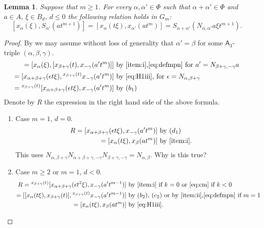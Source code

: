 \documentclass[oneside, 10pt]{amsart}
\newcommand{\rA}{\mathsf{A}}
\numberwithin{equation}{section}
\newtheorem{lemma}{Lemma}
\numberwithin{lemma}{section}
\theoremstyle{definition}
\theoremstyle{remark}
\begin{document}
\begin{lemma} \label{lem:bmp1} Suppose that $m\geq 1$. For every $\alpha, \alpha' \in \Phi$ such that $\alpha+\alpha' \in \Phi$ and
 $a\in A$, $\xi \in B_d$, $d \leq 0$ the following relation holds in $G_m$: 
\begin{equation} \nonumber
[x_\alpha(\xi), S_{\alpha'}(at^{m+1})] = [x_\alpha(t\xi), x_{\alpha'}(at^m)] = S_{\alpha+\alpha'}(N_{\alpha,\alpha'}a\xi t^{m+1}).
\end{equation}
\end{lemma}
\begin{proof}
By \cite[Lemma~3.1.2]{RS76} we may assume without loss of generality that $\alpha'=\beta$ for some $\rA_3$-triple $(\alpha, \beta, \gamma)$.
\begin{align*}
   [x_\alpha(\xi), S_\beta(at^{m+1})] = [x_\alpha(\xi), [x_{\beta + \gamma}(t), x_{-\gamma}(a't^m)]]&  \text{ by~\eqref{item:i},\eqref{eq:defmpn} for $a' = N_{\beta+\gamma, -\gamma} a$} \\ 
 = [x_{\alpha+\beta+\gamma}(\epsilon t\xi), {}^{x_{\beta+\gamma}(t)}x_{-\gamma}(a't^m)]             &  \text{ by~\eqref{eq:H1iii}, for $\epsilon=N_{\alpha, \beta+\gamma}$} \\
 = {}^{x_{\beta+\gamma}(t)}[x_{\alpha+\beta+\gamma}(\epsilon t\xi), x_{-\gamma}(a't^m)]             &  \text{ by $(b_1)$}
\end{align*} 
Denote by $R$ the expression in the right hand side of the above formula.
\begin{enumerate}
 \item \label{case:cm-1} Case $m=1$, $d = 0$.
 \begin{align*}
   R  = [x_{\alpha +\beta + \gamma}(\epsilon t\xi), x_{-\gamma}(a't^m)] & \text{ by $(d_1)$}\\
        = [x_\alpha(t\xi), x_\beta(at^m)]                               & \text{ by~\eqref{item:i}. }   
 \end{align*}  
 This uses $N_{\alpha, \beta+\gamma} N_{\alpha+\beta+\gamma, -\gamma} N_{\beta+\gamma, -\gamma} = N_{\alpha, \beta}$. Why is this true?

 \item \label{case:cm-2} Case $m\geq 2$ or $m=1$, $d < 0$.
 \begin{align*}
 R = {}^{x_{\beta+\gamma}(t)}[x_{\alpha+\beta+\gamma}(\epsilon t^2\xi), x_{-\gamma}(a't^{m-1})]       &  \text{ by~\eqref{item:i} if $k=0$ or~\eqref{eq:cm} if $k <0$} \\
 = [[x_\alpha(t\xi), x_{\beta+\gamma}(t)], {}^{x_{\beta+\gamma}(t)} x_{-\gamma}(a't^{m-1})]         &  \text{ by~$(b_2)$, $(c_2)$ or by~\eqref{item:ii},\eqref{eq:defmpn} if $m=1$} \\
 = [x_\alpha(t\xi), x_\beta(at^m)]                                                                  &  \text{ by~\eqref{eq:H1iii}. \qedhere}
\end{align*} 

\end{enumerate}
\end{proof}
\end{document}
